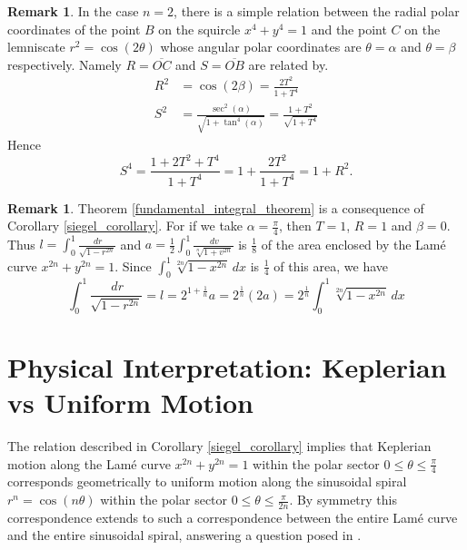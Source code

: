 \documentclass{amsart}
\theoremstyle{definition}
\newtheorem{remark}[theorem]{Remark}
\begin{document}
\bigskip

\begin{remark}
In the case $n=2$, there is a simple relation between the radial polar coordinates of the point $B$ on the squircle
$x^4+y^4=1$ and the point $C$ on the lemniscate $r^2=\cos(2\theta)$ whose angular polar coordinates are
$\theta=\alpha$ and $\theta=\beta$ respectively. Namely $R=\overline{OC}$ and $S=\overline{OB}$ are related by.
\begin{align*}
R^2 &=\cos(2\beta)=\frac{2T^2}{1+T^4}\\
S^2 &=\frac{\sec^2(\alpha)}{\sqrt{1+\tan^4(\alpha)}}=\frac{1+T^2}{\sqrt{1+T^4}}
\end{align*}
Hence
\[S^4=\frac{1+2T^2+T^4}{1+T^4}=1+\frac{2T^2}{1+T^4}=1+R^2.\]
\end{remark}

\vspace{30pt}

\begin{remark}
Theorem \ref{fundamental_integral_theorem}  is a consequence of Corollary \ref{siegel_corollary}. For if we take $\alpha=\frac{\pi}{4}$, then $T=1$,
$R=1$ and $\beta=0$. Thus $l=\int_0^1\frac{\,dr}{\sqrt{1-r^{2n}}}$ and $a=\frac{1}{2}\int_0^1\frac{\,dv}{\sqrt[n]{1+v^{2n}}}$ is $\frac{1}{8}$ of the area
enclosed by the Lam\'e curve $x^{2n}+y^{2n}=1$. Since $\int_0^1\sqrt[2n]{1-x^{2n}}\,dx$ is $\frac{1}{4}$ of this area, we have
\begin{equation}
\int_0^1\frac{\,dr}{\sqrt{1-r^{2n}}}=l=2^{1+\frac{1}{n}}a=2^{\frac{1}{n}}(2a)=2^{\frac{1}{n}}\int_0^1\sqrt[2n]{1-x^{2n}}\,dx
\end{equation}
\end{remark}


\bigskip

\section{Physical Interpretation: Keplerian vs Uniform Motion}\label{physics_interpretation}

The relation described in Corollary \ref{siegel_corollary}  implies that Keplerian motion along the Lam\'e curve $x^{2n}+y^{2n}=1$ within the polar sector  $0\le\theta\le\frac{\pi}{4}$ corresponds geometrically to uniform motion along the sinusoidal spiral $r^n=\cos(n\theta)$  within the polar sector $0\le\theta\le\frac{\pi}{2n}$.  By symmetry this correspondence extends to such a correspondence between the entire Lam\'e curve and the entire sinusoidal spiral, answering a question posed in \cite[Remark 6]{Fiedorowicz-Ramalingam}.
\end{document}
